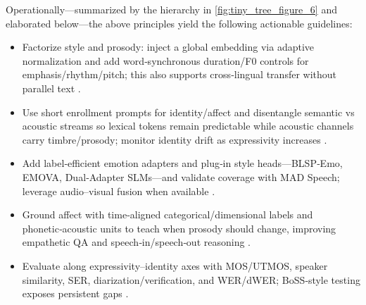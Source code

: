 \documentclass{article}
\begin{document}
Operationally—summarized by the hierarchy in \autoref{fig:tiny_tree_figure_6} and elaborated below—the above principles yield the following actionable guidelines:
\begin{itemize}
\item Factorize style and prosody: inject a global embedding via adaptive normalization and add word‑synchronous duration/F0 controls for emphasis/rhythm/pitch; this also supports cross‑lingual transfer without parallel text \cite{huang2023holisticcascadesystembenchmarkhumanevalu}.
\item Use short enrollment prompts for identity/affect and disentangle semantic vs acoustic streams so lexical tokens remain predictable while acoustic channels carry timbre/prosody; monitor identity drift as expressivity increases \cite{wang2024evaluatingtextspeechsynthesislargediscre}.
\item Add label‑efficient emotion adapters and plug‑in style heads—BLSP‑Emo, EMOVA, Dual‑Adapter SLMs—and validate coverage with MAD Speech; leverage audio–visual fusion when available \cite{wang2024blspemotowardsempatheticlargespeechlangu,futeral2025madspeechmeasuresacousticdiversity,chen2025emovaempoweringlanguagemodelsseehearspea,wang2025dualinformationspeechlanguagemodelsemoti}.
\item Ground affect with time‑aligned categorical/dimensional labels and phonetic‑acoustic units to teach when prosody should change, improving empathetic QA and speech‑in/speech‑out reasoning \cite{wang2025incorporatingcontextualparalinguisticund,har-tuv2025pastphoneticacousticspeechtokenizer,entry2025indicsuperbspeechprocessinguniversalperf}.
\item Evaluate along expressivity–identity axes with MOS/UTMOS, speaker similarity, SER, diarization/verification, and WER/dWER; BoSS‑style testing exposes persistent gaps \cite{wang2025bossbeyondsemanticspeech}.
\end{itemize}

\end{document}
